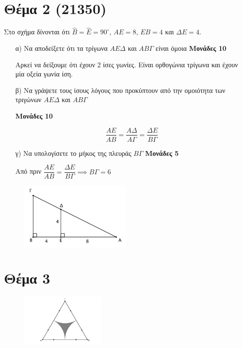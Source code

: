 \documentclass[12pt]{extarticle}
\begin{document}
\section*{Θέμα 2 (21350)}
\noindent
Στο σχήμα δίνονται ότι $\hat{Β}=\hat{Ε}=90^{\circ}$, $ΑΕ=8$, $ΕΒ=4$ και $ΔΕ=4$.
\begin{enumerate}
    \item[α)] Να αποδείξετε ότι τα τρίγωνα $ΑΕΔ$ και $ΑΒΓ$ είναι όμοια \hspace*{\fill} \textbf{Μονάδες 10}

        Αρκεί να δείξουμε ότι έχουν 2 ίσες γωνίες. Είναι ορθογώνια τρίγωνα και έχουν μία οξεία γωνία ίση.

    \item[β)] Να γράψετε τους ίσους λόγους που προκύπτουν από την ομοιότητα των τριγώνων $ΑΕΔ$ και $ΑΒΓ$

        \hspace*{\fill} \textbf{Μονάδες 10}

        $$\dfrac{ΑΕ}{ΑΒ}=\dfrac{ΑΔ}{ΑΓ}=\dfrac{ΔΕ}{ΒΓ}$$
    \item[γ)] Να υπολογίσετε το μήκος της πλευράς $ΒΓ$ \hspace*{\fill} \textbf{Μονάδες 5}

        Από πριν $\dfrac{ΑΕ}{ΑΒ}=\dfrac{ΔΕ}{ΒΓ}\implies ΒΓ=6$
\end{enumerate}
\begin{figure}[h]

    \centering
    \includegraphics[width=0.50\textwidth]{2023(2)}
\end{figure}

\section*{Θέμα 3}
\noindent

\begin{figure}
    \centering
    \vspace{-20pt}
    \hspace{-80pt}
    \includegraphics[width=0.38\textwidth]{2017BGeo3}
\end{figure}
\end{document}

